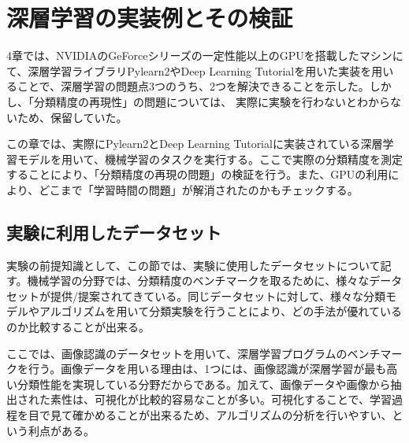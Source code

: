 \chapter{深層学習の実装例とその検証}
4章では、NVIDIAのGeForceシリーズの一定性能以上のGPUを搭載したマシンにて、深層学習ライブラリPylearn2やDeep Learning Tutorialを用いた実装を用いることで、深層学習の問題点3つのうち、2つを解決できることを示した。しかし、「分類精度の再現性」の問題については、 実際に実験を行わないとわからないため、保留していた。\par
この章では、実際にPylearn2とDeep Learning Tutorialに実装されている深層学習モデルを用いて、機械学習のタスクを実行する。ここで実際の分類精度を測定することにより、「分類精度の再現の問題」の検証を行う。また、GPUの利用により、どこまで「学習時間の問題」が解消されたのかもチェックする。

\section{実験に利用したデータセット}
実験の前提知識として、この節では、実験に使用したデータセットについて記す。機械学習の分野では、分類精度のベンチマークを取るために、様々なデータセットが提供/提案されてきている。同じデータセットに対して、様々な分類モデルやアルゴリズムを用いて分類実験を行うことにより、どの手法が優れているのか比較することが出来る。\par
ここでは、画像認識のデータセットを用いて、深層学習プログラムのベンチマークを行う。画像データを用いる理由は、1つには、画像認識が深層学習が最も高い分類性能を実現している分野だからである。加えて、画像データや画像から抽出された素性は、可視化が比較的容易なことが多い。可視化することで、学習過程を目で見て確かめることが出来るため、アルゴリズムの分析を行いやすい、という利点がある。
